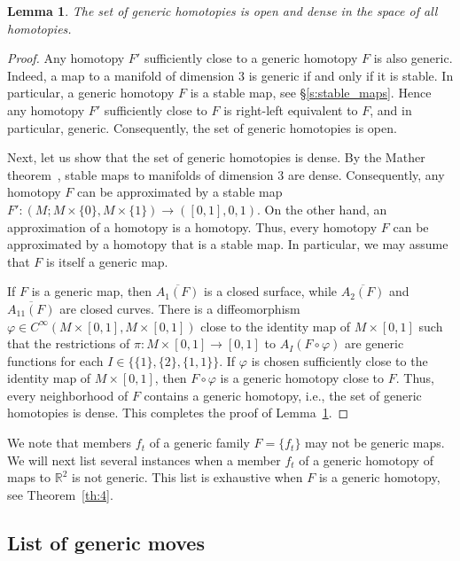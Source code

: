 \documentclass[12pt]{amsart}
\def \R{\mathbb{R}}
\def\co{\colon}
\newtheorem{lemma}[theorem]{Lemma}
\theoremstyle{definition}
\begin{document}
\begin{lemma}\label{lem:3} The set of generic homotopies is open and dense in the space of all homotopies. 
\end{lemma}
\begin{proof}  
Any homotopy $F'$ sufficiently close to a generic homotopy $F$ is also generic. Indeed, a map to a manifold of dimension $3$ is generic if and only if it is stable. In particular, a generic homotopy $F$ is a stable map, see \S\ref{s:stable_maps}. Hence any homotopy $F'$ sufficiently close to $F$ is right-left equivalent to $F$, and in particular, generic. 
 Consequently, the set of generic homotopies is open.  

 Next, let us show that the set of generic homotopies is dense.
By the Mather theorem~\cite{MaVI}, stable maps to manifolds of dimension $3$ are dense. Consequently, any homotopy $F$ can be approximated by a stable map $F'\co (M; M\times \{0\}, M\times \{1\})\to ([0,1], 0, 1)$. On the other hand, an approximation of a homotopy is a homotopy. Thus, every homotopy $F$ can be approximated by a homotopy that is a stable map.  In particular, we may assume that $F$ is itself a generic map. 

If $F$ is a generic map, then $\overline{A_1(F)}$ is a closed surface, while $\overline{A_2(F)}$ and $\overline{A_{11}(F)}$ are closed curves. There is a diffeomorphism $\varphi \in C^\infty(M\times [0,1], M\times [0,1])$ close to the identity map of $M \times [0,1]$ such that the restrictions of $\pi\co M\times [0,1]\to [0,1]$ to $A_I(F\circ \varphi)$ are generic functions for each $I\in \{\{1\}, \{2\}, \{1,1\}\}$.   If $\varphi$ is chosen sufficiently close to the identity map of $M \times [0,1]$,    then $F\circ \varphi$ is a generic homotopy close to $F$. Thus, every neighborhood of $F$ contains a generic homotopy, i.e., the set of generic homotopies is dense. This completes the proof of Lemma~\ref{lem:3}. 
\end{proof}


We note that members $f_t$ of a generic family $F=\{f_t\}$ may not be generic maps. We will next list several instances when a member $f_t$ of a generic homotopy of maps to $\R^2$ is not generic. This list is exhaustive when $F$ is a generic homotopy, see Theorem~\ref{th:4}. 

\subsection{List of generic moves}
\end{document}
